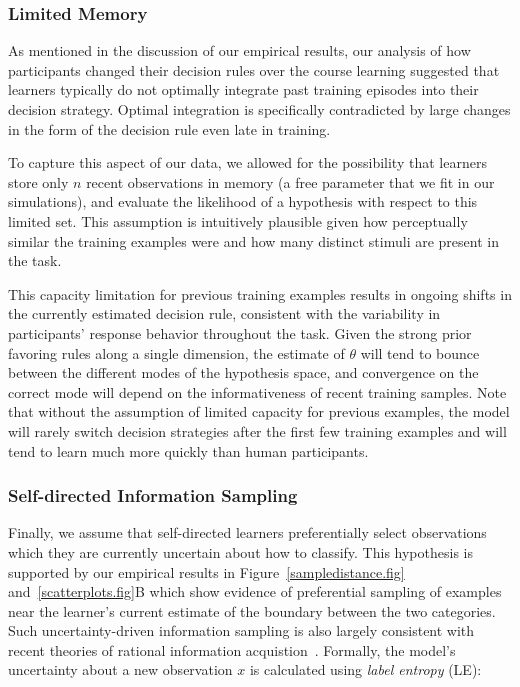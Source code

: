 \documentclass[3p,twocolumn,authoryear,10pt]{elsarticle}
\begin{document}
\subsubsection{Limited Memory} 
As mentioned in the discussion of our empirical results, our analysis of how participants changed their decision rules over the course learning suggested that learners typically do not optimally
integrate past training episodes into their decision strategy.   Optimal integration is specifically contradicted by large changes in the form of the decision rule even late in training.    

To capture this aspect of our data, we allowed for the possibility that learners store only $n$ recent observations in memory (a free parameter that we fit in our simulations), and evaluate the likelihood of a hypothesis with respect to this limited set.   This assumption is intuitively plausible given how perceptually similar the training examples were and how many distinct stimuli are present in the task.

This capacity limitation for previous training examples results in ongoing shifts in the currently estimated decision rule, consistent with the variability in participants' response behavior throughout the task.  Given the strong prior favoring rules along a single dimension, the estimate of $\theta$ will tend to bounce between the different modes of the hypothesis space, and convergence on the correct mode will depend on the informativeness of recent training samples.   Note that without the assumption of limited capacity for previous examples, the model will rarely switch decision strategies after the first few training examples and will tend to learn much more quickly than human participants.\\

\subsubsection{Self-directed Information Sampling} 
Finally, we assume that self-directed learners preferentially select observations which they are currently uncertain about how to classify.  This hypothesis is supported by our empirical results in Figure~\ref{sampledistance.fig} and~\ref{scatterplots.fig}B which show evidence of preferential sampling of examples near the learner's current estimate of the boundary between the two categories.  Such uncertainty-driven information sampling is also largely consistent with recent theories of rational information acquistion~\citep{Oaksford:1994tw,Nelson:2005ph}. Formally, the model's uncertainty about a new observation $x$ is calculated using \textit{label entropy} (LE):
\end{document}
